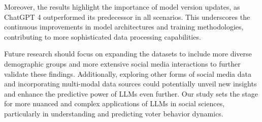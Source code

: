 \documentclass[sigconf,natbib=false]{acmart}
\begin{document}
Moreover, the results highlight the importance of model version updates, as ChatGPT 4 outperformed its predecessor in all scenarios. This underscores the continuous improvements in model architectures and training methodologies, contributing to more sophisticated data processing capabilities.

Future research should focus on expanding the datasets to include more diverse demographic groups and more extensive social media interactions to further validate these findings. Additionally, exploring other forms of social media data and incorporating multi-modal data sources could potentially unveil new insights and enhance the predictive power of LLMs even further. Our study sets the stage for more nuanced and complex applications of LLMs in social sciences, particularly in understanding and predicting voter behavior dynamics.





\appendix
\end{document}
